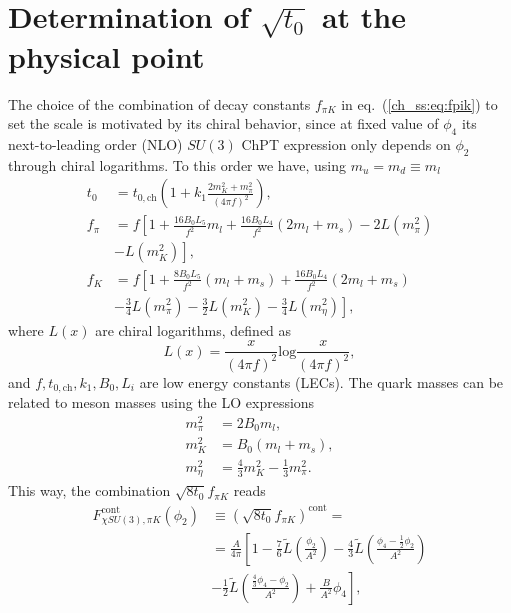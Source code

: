 

\section{Determination of $\sqrt{t_0}$ at the physical point}
\label{ch_ss:sec:Results}

The choice of the combination of decay constants $f_{\pi K}$ in eq.~(\ref{ch_ss:eq:fpik}) to set the scale is motivated by its chiral behavior, since at fixed value of $\phi_4$ its next-to-leading order (NLO) $SU(3)$ ChPT expression only depends on $\phi_2$ through chiral logarithms. To this order we have, using $m_u=m_d\equiv m_l$~\citep{FLAG16,Bar:2013ora}
\begin{align}
\label{ch_ss:eq:t0_chiral}
t_0&=t_{0,\textrm{ch}}\left(1+k_1\frac{2m_K^2+m_{\pi}^2}{(4\pi f)^2}\right), \\
f_{\pi}&=f\left[1+\frac{16B_0L_5}{f^2}m_l+\frac{16B_0L_4}{f^2}(2m_l+m_s)-2L(m_{\pi}^2)\right. \\
&\left.-L(m_K^2)\right], \\
f_K&=f\left[1+\frac{8B_0L_5}{f^2}(m_l+m_s)+\frac{16B_0L_4}{f^2}(2m_l+m_s)\right. \\
&\left.-\frac{3}{4}L(m_{\pi}^2)-\frac{3}{2}L(m_K^2)-\frac{3}{4}L(m_{\eta}^2)\right],
\end{align}
where $L(x)$ are chiral logarithms, defined as
\begin{equation}
L(x)=\frac{x}{(4\pi f)^2}\textrm{log}\frac{x}{(4\pi f)^2},
\end{equation}
and $f,t_{0,\textrm{ch}},k_1,B_0,L_i$ are low energy constants (LECs). The quark masses can be related to meson masses using the LO expressions
\begin{align}
m_{\pi}^2&=2B_0m_l, \\
m_K^2&=B_0(m_l+m_s), \\
m_{\eta}^2&=\frac{4}{3}m_K^2-\frac{1}{3}m_{\pi}^2.
\end{align}
This way, the combination $\sqrt{8t_0}f_{\pi K}$ reads
\begin{align}
\label{ch_ss:eq:SU3ChPT}
F_{\chi SU(3),\pi K}^{\textrm{cont}}(\phi_2)&\equiv\left(\sqrt{8t_0}f_{\pi K}\right)^{\textrm{cont}}=\\
&=\frac{A}{4\pi}\left[1-\frac{7}{6}\tilde{L}\left(\frac{\phi_2}{A^2}\right)-\frac{4}{3}\tilde{L}\left(\frac{\phi_4-\frac{1}{2}\phi_2}{A^2}\right)\right. \\
&\left.-\frac{1}{2}\tilde{L}\left(\frac{\frac{4}{3}\phi_4-\phi_2}{A^2}\right)+\frac{B}{A^2}\phi_4\right],
\end{align}
